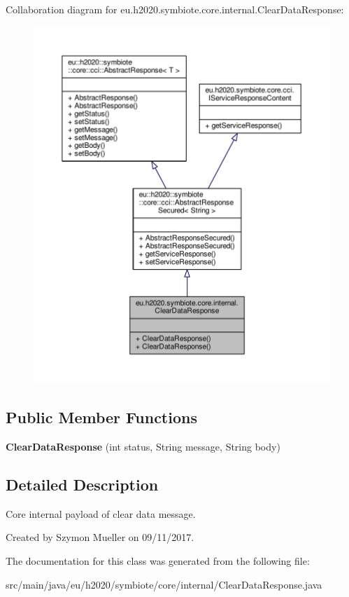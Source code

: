 Collaboration diagram for eu.\+h2020.\+symbiote.\+core.\+internal.\+Clear\+Data\+Response\+:\nopagebreak
\begin{figure}[H]
\begin{center}
\leavevmode
\includegraphics[width=350pt]{classeu_1_1h2020_1_1symbiote_1_1core_1_1internal_1_1ClearDataResponse__coll__graph}
\end{center}
\end{figure}
\subsection*{Public Member Functions}
\begin{DoxyCompactItemize}
\item 
\mbox{\label{classeu_1_1h2020_1_1symbiote_1_1core_1_1internal_1_1ClearDataResponse_a9cf8ed56c820a16ad6b4516d0c1d7035}} 
{\bfseries Clear\+Data\+Response} (int status, String message, String body)
\end{DoxyCompactItemize}


\subsection{Detailed Description}
Core internal payload of clear data message.

Created by Szymon Mueller on 09/11/2017. 

The documentation for this class was generated from the following file\+:\begin{DoxyCompactItemize}
\item 
src/main/java/eu/h2020/symbiote/core/internal/Clear\+Data\+Response.\+java\end{DoxyCompactItemize}
